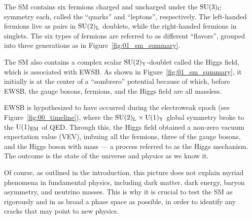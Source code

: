 The SM contains six fermions charged and uncharged under the $\SU[3]_{\mathrm{C}}$ symmetry each, called the ``quarks'' and ``leptons'', respectively.
The left-handed fermions live as pairs in $\SU[2]_{\mathrm{L}}$ doublets, while the right-handed fermions in singlets.
The six types of fermions are referred to as different ``flavors'', grouped into three generations as in Figure~\ref{fig:01_sm_summary}.

The SM also contains a complex scalar $\SU[2]_{\mathrm{Y}}$-doublet called the Higgs field, which is associated with EWSB.
As shown in Figure~\ref{fig:01_sm_summary}, it initially is at the center of a ``sombrero'' potential because of which, before EWSB, the gauge bosons, fermions, and the Higgs field are all massless.

EWSB is hypothesized to have occurred during the electroweak epoch (see Figure~\ref{fig:00_timeline}), where the $\SU[2]_{\mathrm{L}} \times \UU[1]_{\mathrm{Y}}$ global symmetry broke to the $\UU[1]_{\mathrm{EM}}$ of QED.
Through this, the Higgs field obtained a non-zero vacuum expectation value (VEV), imbuing all the fermions, three of the gauge bosons, and the Higgs boson with mass --- a process referred to as the Higgs mechanism.
The outcome is the state of the universe and physics as we know it.

Of course, as outlined in the introduction, this picture does not explain myriad phenomena in fundamental physics, including dark matter, dark energy, baryon asymmetry, and neutrino masses.
This is why it is crucial to test the SM as rigorously and in as broad a phase space as possible, in order to identify any cracks that may point to new physics.


